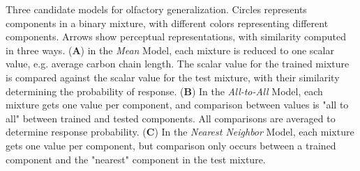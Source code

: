\label{fig:cartoon}
Three candidate models for olfactory generalization.  Circles represents components in a binary mixture, with different colors representing different components.  Arrows show perceptual representations, with similarity computed in three ways. (\textbf{A}) in the \textit{Mean} Model, each mixture is reduced to one scalar value, e.g. average carbon chain length.  The scalar value for the trained mixture is compared against the scalar value for the test mixture, with their similarity determining the probability of response. (\textbf{B}) In the \textit{All-to-All} Model, each mixture gets one value per component, and comparison between values is "all to all" between trained and tested components.  All comparisons are averaged to determine response probability. (\textbf{C}) In the \textit{Nearest Neighbor} Model, each mixture gets one value per component, but comparison only occurs between a trained component and the "nearest" component in the test mixture.  